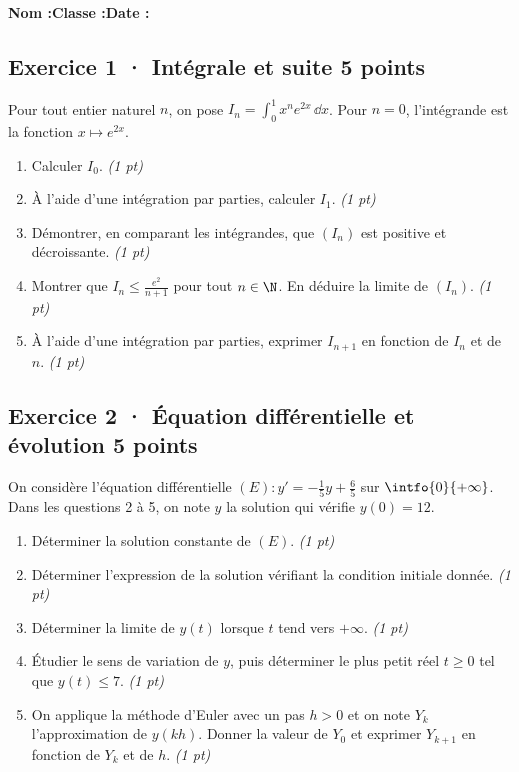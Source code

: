 \smallskip\textbf{Nom :}\enspace\dotfill\quad\textbf{Classe :}\enspace\dotfill\quad\textbf{Date :}\enspace\dotfill

\subsection*{Exercice 1 · Intégrale et suite \hfill 5 points}Pour tout entier naturel $n$, on pose $I_n=\displaystyle\int_0^1x^ne^{2x}\,\dd x$. Pour $n=0$, l'intégrande est la fonction $x\mapsto e^{2x}$.

\begin{enumerate}

\item Calculer $I_0$. \hfill\textit{(1 pt)}

\item À l'aide d'une intégration par parties, calculer $I_1$. \hfill\textit{(1 pt)}

\item Démontrer, en comparant les intégrandes, que $(I_n)$ est positive et décroissante. \hfill\textit{(1 pt)}

\item Montrer que $I_n\le\frac{e^{2}}{n+1}$ pour tout $n\in\N$. En déduire la limite de $(I_n)$. \hfill\textit{(1 pt)}

\item À l'aide d'une intégration par parties, exprimer $I_{n+1}$ en fonction de $I_n$ et de $n$. \hfill\textit{(1 pt)}

\end{enumerate}

\subsection*{Exercice 2 · Équation différentielle et évolution \hfill 5 points}On considère l'équation différentielle $(E):y'=-\frac1{5}y+\frac{6}{5}$ sur $\intfo{0}{+\infty}$. Dans les questions 2 à 5, on note $y$ la solution qui vérifie $y(0)=12$.

\begin{enumerate}

\item Déterminer la solution constante de $(E)$. \hfill\textit{(1 pt)}

\item Déterminer l'expression de la solution vérifiant la condition initiale donnée. \hfill\textit{(1 pt)}

\item Déterminer la limite de $y(t)$ lorsque $t$ tend vers $+\infty$. \hfill\textit{(1 pt)}

\item Étudier le sens de variation de $y$, puis déterminer le plus petit réel $t\ge0$ tel que $y(t)\le7$. \hfill\textit{(1 pt)}

\item On applique la méthode d'Euler avec un pas $h>0$ et on note $Y_k$ l'approximation de $y(kh)$. Donner la valeur de $Y_0$ et exprimer $Y_{k+1}$ en fonction de $Y_k$ et de $h$. \hfill\textit{(1 pt)}

\end{enumerate}

